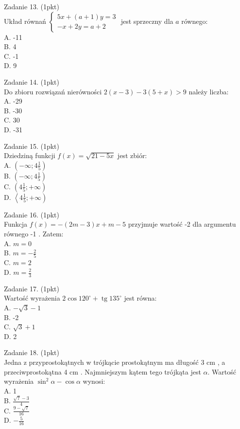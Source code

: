 \documentclass[10pt]{article}
\begin{document}
Zadanie 13. (1pkt)\\
Układ równań \(\left\{\begin{array}{c}5 x+(a+1) y=3 \\ -x+2 y=a+2\end{array}\right.\) jest sprzeczny dla \(a\) równego:\\
A. -11\\
B. 4\\
C. -1\\
D. 9

Zadanie 14. (1pkt)\\
Do zbioru rozwiązań nierówności \(2(x-3)-3(5+x)>9\) należy liczba:\\
A. -29\\
B. -30\\
C. 30\\
D. -31

Zadanie 15. (1pkt)\\
Dziedziną funkcji \(f(x)=\sqrt{21-5 x}\) jest zbiór:\\
A. \(\left(-\infty ; 4 \frac{1}{5}\right)\)\\
B. \(\left(-\infty ; 4 \frac{1}{5}\right)\)\\
C. \(\left(4 \frac{1}{5} ;+\infty\right)\)\\
D. \(\left\langle 4 \frac{1}{5} ;+\infty\right)\)

Zadanie 16. (1pkt)\\
Funkcja \(f(x)=-(2 m-3) x+m-5\) przyjmuje wartość -2 dla argumentu równego -1 . Zatem:\\
A. \(m=0\)\\
B. \(m=-\frac{2}{5}\)\\
C. \(m=2\)\\
D. \(m=\frac{2}{3}\)

Zadanie 17. (1pkt)\\
Wartość wyrażenia \(2 \cos 120^{\circ}+\operatorname{tg} 135^{\circ}\) jest równa:\\
A. \(-\sqrt{3}-1\)\\
B. -2\\
C. \(\sqrt{3}+1\)\\
D. 2

Zadanie 18. (1pkt)\\
Jedna z przyprostokątnych w trójkącie prostokątnym ma długość 3 cm , a przeciwprostokątna 4 cm . Najmniejszym kątem tego trójkąta jest \(\alpha\). Wartość wyrażenia \(\sin ^{2} \alpha-\cos \alpha\) wynosi:\\
A. 1\\
B. \(\frac{\sqrt{7}-3}{4}\)\\
C. \(\frac{9-\sqrt{7}}{16}\)\\
D. \(-\frac{5}{16}\)
\end{document}
